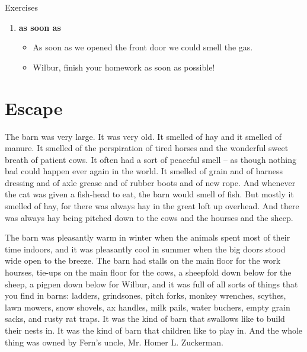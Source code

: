 \documentclass[a4paper, oneside]{book}
\begin{document}
\vspace{1cm}

\bgroup
{}\selectfont

{\Huge Exercises}

{
\large

 \begin{enumerate}
  \item \textbf{as soon as}
      \begin{itemize}
          \item As soon as we opened the front door we could smell the gas.
          
          \item Wilbur, finish your homework as soon as possible!
      \end{itemize}
   
  
 \end{enumerate}
 
}
\egroup


 \chapter{Escape}
 
 The barn was very large. It was very old. It smelled of hay and it
smelled of manure. It smelled of the perspiration of tired horses
and the wonderful sweet breath of patient cows. It often had a sort
of peaceful smell -- as though nothing bad could happen ever again
in the world. It smelled of grain and of harness dressing and of axle
grease and of rubber boots and of new rope. And whenever the cat 
was given a fish-head to eat, the barn would smell of fish. But
mostly it smelled of hay, for there was always hay in the great loft
up overhead. And there was always hay being pitched down to the
cows and the hourses and the sheep.

The barn was pleasantly warm in winter when the animals spent
most of their time indoors, and it was pleasantly cool in summer  
when the big doors stood wide open to the breeze. The barn had
stalls on the main floor for the work hourses, tie-ups on the main
floor for the cows, a sheepfold down below for the sheep, a pigpen
down below for Wilbur, and it was full of all sorts of things that you
find in barns: ladders, grindsones, pitch forks, monkey wrenches,
scythes, lawn mowers, snow shovels, ax handles, milk pails, water
buchers, empty grain sacks, and rusty rat traps. It was the kind of
barn that swallows like to build their nests in. It was the kind of
barn that children like to play in. And the whole thing was owned
by Fern's uncle, Mr. Homer L. Zuckerman. 
\end{document}
